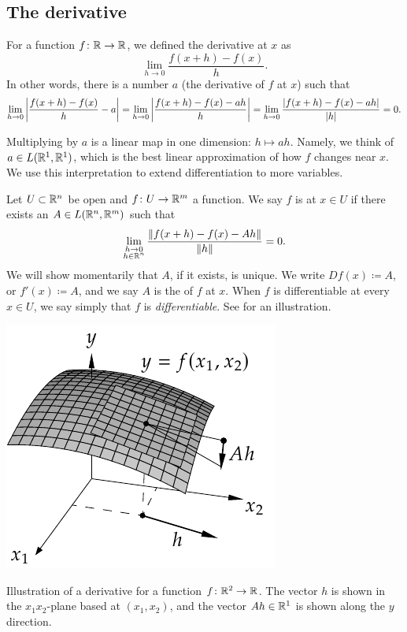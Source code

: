 

\subsection{The derivative}

For a function $f \colon {\mathbb{R}} \to {\mathbb{R}}$, we defined
the derivative at $x$ as
\begin{equation*}
\lim_{h \to 0} \frac{f(x+h)-f(x)}{h} .
\end{equation*}
In other words, there is a number $a$ (the derivative of $f$ at $x$) such that
\begin{equation*}
\lim_{h \to 0} \left\lvert {\frac{f(x+h)-f(x)}{h} - a} \right\rvert
=
\lim_{h \to 0} \left\lvert {\frac{f(x+h)-f(x) - ah}{h}} \right\rvert
=
\lim_{h \to 0} \frac{\lvert {f(x+h)-f(x) - ah} \rvert}{\lvert {h} \rvert}
= 0.
\end{equation*}

Multiplying by $a$ is a linear map in one dimension:
$h \mapsto ah$.
Namely,
we think of $a \in L({\mathbb{R}}^1,{\mathbb{R}}^1)$, 
which is the best linear approximation of
how $f$ changes near $x$.  We use this interpretation
to extend differentiation to more variables.

\begin{defn}
Let $U \subset {\mathbb{R}}^n$ be open and $f \colon U \to {\mathbb{R}}^m$ a function.  We
say $f$ is \emph{} at $x \in U$ if there exists
an $A \in L({\mathbb{R}}^n,{\mathbb{R}}^m)$ such that
\begin{equation*}
\lim_{\substack{h \to 0\\h\in {\mathbb{R}}^n}}
\frac{\lVert {f(x+h)-f(x) - Ah} \rVert}{\lVert {h} \rVert} = 0 .
\end{equation*}
We will show momentarily that $A$, if it exists, is unique.
We write $Df(x) \coloneqq A$, or $f'(x) \coloneqq A$, and
we say $A$ is the \emph{} of $f$ at $x$.
When $f$ is differentiable at
every $x \in U$, we say simply that $f$ is \emph{differentiable}.  See
 for an illustration.
\end{defn}

\begin{myfigureht}
\includegraphics{figures/svder}
\caption{Illustration of a derivative for a function $f \colon {\mathbb{R}}^2 \to {\mathbb{R}}$.  The vector $h$ is shown
in the $x_1x_2$-plane based at $(x_1,x_2)$, and the vector
$Ah \in {\mathbb{R}}^1$ is shown along the $y$ direction.\label{fig:svder}}
\end{myfigureht}

